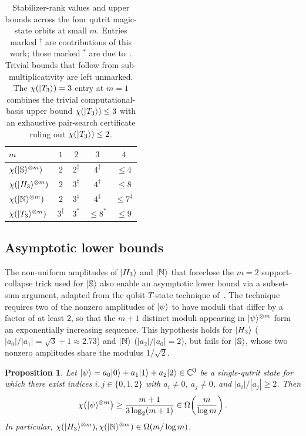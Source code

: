 \documentclass[11pt]{article}
\newtheorem{prop}[theorem]{Proposition}
\theoremstyle{definition}
\newcommand{\microspace}{\mspace{0.5mu}}
\newcommand{\ket}[1]{\lvert\microspace #1 \microspace \rangle}
\newcommand{\complex}{\mathbb{C}}
\newcommand{\chiR}{\chi}
\newcommand{\Strange}{\ket{\mathbb{S}}}
\newcommand{\Hth}{\ket{H_3}}
\newcommand{\Norrell}{\ket{\mathbb{N}}}
\newcommand{\Tth}{\ket{T_3}}
\begin{document}
	\begin{table}[!htbp]
		\centering
		\begin{tabular}{l c c c c}
			\toprule
			$m$ & $1$ & $2$ & $3$ & $4$ \\
			\midrule
			$\chiR(\Strange^{\otimes m})$ & $2$            & $2^{\ddagger}$    & $4^{\ddagger}$        & $\le 4$ \\
			$\chiR(\Hth^{\otimes m})$     & $2$            & $3^{\ddagger}$    & $4^{\ddagger}$        & $\le 8$ \\
			$\chiR(\Norrell^{\otimes m})$ & $2$            & $3^{\ddagger}$    & $4^{\ddagger}$        & $\le 7^{\ddagger}$ \\
			$\chiR(\Tth^{\otimes m})$     & $3^{\ddagger}$ & $3^{\ast}$        & $\le 8^{\ast}$        & $\le 9$ \\
			\bottomrule
		\end{tabular}
		\caption{Stabilizer-rank values and upper bounds across the four qutrit magic-state orbits at small $m$. Entries marked $^{\ddagger}$ are contributions of this work; those marked $^{\ast}$ are due to~\cite{kocia2021improved}. Trivial bounds that follow from sub-multiplicativity are left unmarked. The $\chiR(\Tth) = 3$ entry at $m = 1$ combines the trivial computational-basis upper bound $\chiR(\Tth) \le 3$ with an exhaustive pair-search certificate ruling out $\chiR(\Tth) \le 2$.}
		\label{tab:ub}
	\end{table}
	
	\subsection{Asymptotic lower bounds}\label{ssec:lower}
	
	The non-uniform amplitudes of $\Hth$ and $\Norrell$ that foreclose
	the $m = 2$ support-collapse trick used for $\Strange$ also enable
	an asymptotic lower bound via a subset-sum argument,
	adapted from the qubit-$T$-state technique
	of~\cite{lovitz2022techniques}. The technique requires two of
	the nonzero amplitudes of $\ket\psi$ to
	have moduli that differ by a factor of at least $2$, so that the
	$m + 1$ distinct moduli appearing in $\ket\psi^{\otimes m}$ form an
	exponentially increasing sequence. This hypothesis holds for $\Hth$
	($|a_0|/|a_1| = \sqrt 3 + 1 \approx 2.73$) and $\Norrell$
	($|a_2|/|a_0| = 2$), but fails for $\Strange$, whose two nonzero
	amplitudes share the modulus $1/\sqrt 2$.
	\begin{prop}\label{prop:moulton-qutrit}
		Let $\ket\psi = a_0 \ket 0 + a_1 \ket 1 + a_2 \ket 2 \in \complex^3$
		be a single-qutrit state for which there exist indices
		$i, j \in \{0, 1, 2\}$ with $a_i \ne 0$, $a_j \ne 0$, and
		$|a_i| / |a_j| \ge 2$. Then
		\begin{equation}\label{eq:moulton-qutrit}
			\chiR\!\left(\ket\psi^{\otimes m}\right)
			\ge \frac{m+1}{3 \log_2 (m + 1)}
			\in \Omega\!\left(\frac{m}{\log m}\right).
		\end{equation}
		In particular,
		$\chiR(\Hth^{\otimes m}), \chiR(\Norrell^{\otimes m})
		\in \Omega(m / \log m)$.
	\end{prop}
	
\end{document}
